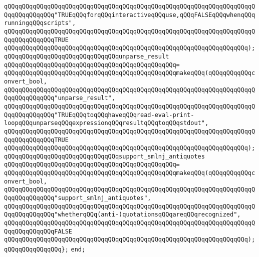 \verb|qQQqqQQqqQQqqQQqqQQqqQQqqQQqqQQqqQQqqQQqqQQqqQQqqQQqqQQqqQQqqQQqqQQqqQQqqQQqqQQqqQQq"TRUEqQQqforqQQqinteractiveqQQquse,qQQqFALSEqQQqwhenqQQqrunningqQQqscripts",|\newline
\verb|qQQqqQQqqQQqqQQqqQQqqQQqqQQqqQQqqQQqqQQqqQQqqQQqqQQqqQQqqQQqqQQqqQQqqQQqqQQqqQQqqQQqTRUE|\newline
\verb|qQQqqQQqqQQqqQQqqQQqqQQqqQQqqQQqqQQqqQQqqQQqqQQqqQQqqQQqqQQqqQQqqQQq);|\newline
\newline
\verb|qQQqqQQqqQQqqQQqqQQqqQQqqQQqqQQqunparse_result|\newline
\verb|qQQqqQQqqQQqqQQqqQQqqQQqqQQqqQQqqQQqqQQqqQQqqQQq=|\newline
\verb|qQQqqQQqqQQqqQQqqQQqqQQqqQQqqQQqqQQqqQQqqQQqqQQqmakeqQQq(qQQqqQQqqQQqconvert_bool,|\newline
\verb|qQQqqQQqqQQqqQQqqQQqqQQqqQQqqQQqqQQqqQQqqQQqqQQqqQQqqQQqqQQqqQQqqQQqqQQqqQQqqQQqqQQq"unparse_result",|\newline
\verb|qQQqqQQqqQQqqQQqqQQqqQQqqQQqqQQqqQQqqQQqqQQqqQQqqQQqqQQqqQQqqQQqqQQqqQQqqQQqqQQqqQQq"TRUEqQQqtoqQQqhaveqQQqread-eval-print-loopqQQqunparseqQQqexpressionqQQqresultqQQqtoqQQqstdout",|\newline
\verb|qQQqqQQqqQQqqQQqqQQqqQQqqQQqqQQqqQQqqQQqqQQqqQQqqQQqqQQqqQQqqQQqqQQqqQQqqQQqqQQqqQQqTRUE|\newline
\verb|qQQqqQQqqQQqqQQqqQQqqQQqqQQqqQQqqQQqqQQqqQQqqQQqqQQqqQQqqQQqqQQqqQQq);|\newline
\newline
\verb|qQQqqQQqqQQqqQQqqQQqqQQqqQQqqQQqsupport_smlnj_antiquotes|\newline
\verb|qQQqqQQqqQQqqQQqqQQqqQQqqQQqqQQqqQQqqQQqqQQqqQQq=|\newline
\verb|qQQqqQQqqQQqqQQqqQQqqQQqqQQqqQQqqQQqqQQqqQQqqQQqmakeqQQq(qQQqqQQqqQQqconvert_bool,|\newline
\verb|qQQqqQQqqQQqqQQqqQQqqQQqqQQqqQQqqQQqqQQqqQQqqQQqqQQqqQQqqQQqqQQqqQQqqQQqqQQqqQQqqQQq"support_smlnj_antiquotes",|\newline
\verb|qQQqqQQqqQQqqQQqqQQqqQQqqQQqqQQqqQQqqQQqqQQqqQQqqQQqqQQqqQQqqQQqqQQqqQQqqQQqqQQqqQQq"whetherqQQq(anti-)quotationsqQQqareqQQqrecognized",|\newline
\verb|qQQqqQQqqQQqqQQqqQQqqQQqqQQqqQQqqQQqqQQqqQQqqQQqqQQqqQQqqQQqqQQqqQQqqQQqqQQqqQQqqQQqFALSE|\newline
\verb|qQQqqQQqqQQqqQQqqQQqqQQqqQQqqQQqqQQqqQQqqQQqqQQqqQQqqQQqqQQqqQQqqQQq);|\newline
\verb|qQQqqQQqqQQqqQQq};|\newline
\verb|end;|\newline
\newline
\newline
\newline
\newline
\newline
\newline
\newline

